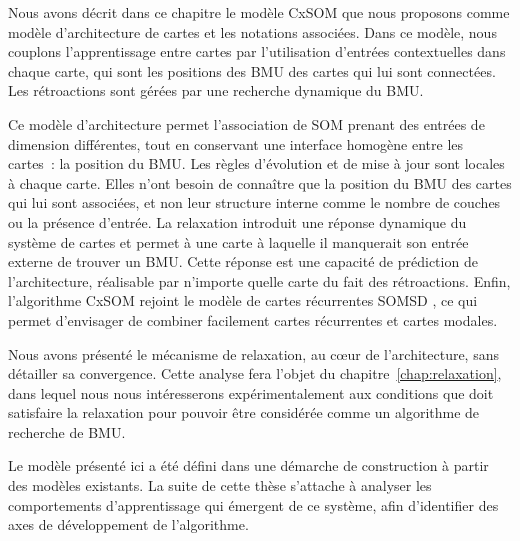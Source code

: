 \documentclass[../main]{subfiles}
\begin{document}
Nous avons décrit dans ce chapitre le modèle CxSOM que nous proposons comme modèle d'architecture de cartes et les notations associées.
Dans ce modèle, nous couplons l'apprentissage entre cartes par l'utilisation d'entrées contextuelles dans chaque carte, qui sont les positions des BMU des cartes qui lui sont connectées. Les rétroactions sont gérées par une recherche dynamique du BMU.

Ce modèle d'architecture permet l'association de SOM prenant des entrées de dimension différentes, tout en conservant une interface homogène entre les cartes~: la position du BMU.
Les règles d'évolution et de mise à jour sont locales à chaque carte. Elles n'ont besoin de connaître que la position du BMU des cartes qui lui sont associées, et non leur structure interne comme le nombre de couches ou la présence d'entrée. La relaxation introduit une réponse dynamique du système de cartes et permet à une carte à laquelle il manquerait son entrée externe de trouver un BMU. Cette réponse est une capacité de prédiction de l'architecture, réalisable par n'importe quelle carte du fait des rétroactions.
Enfin, l'algorithme CxSOM rejoint le modèle de cartes récurrentes SOMSD \parencite{hammer_recursive_2004}, ce qui permet d'envisager de combiner facilement cartes récurrentes et cartes modales.

Nous avons présenté le mécanisme de relaxation, au c\oe{}ur de l'architecture, sans détailler sa convergence. Cette analyse fera l'objet du chapitre~\ref{chap:relaxation}, dans lequel nous nous intéresserons expérimentalement aux conditions que doit satisfaire la relaxation pour pouvoir être considérée comme un algorithme de recherche de BMU.

Le modèle présenté ici a été défini dans une démarche de construction à partir des modèles existants.
La suite de cette thèse s'attache à analyser les comportements d'apprentissage qui émergent de ce système, afin d'identifier des axes de développement de l'algorithme.
\end{document}
